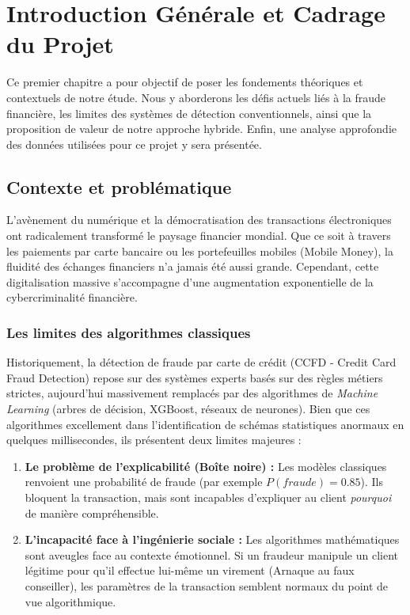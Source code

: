 \documentclass[12pt, a4paper, twoside]{report}
\begin{document}

\tableofcontents
\newpage
\listoffigures
\newpage
\listoftables
\newpage


\chapter{Introduction Générale et Cadrage du Projet}

Ce premier chapitre a pour objectif de poser les fondements théoriques et contextuels de notre étude. Nous y aborderons les défis actuels liés à la fraude financière, les limites des systèmes de détection conventionnels, ainsi que la proposition de valeur de notre approche hybride. Enfin, une analyse approfondie des données utilisées pour ce projet y sera présentée.

\section{Contexte et problématique}

L'avènement du numérique et la démocratisation des transactions électroniques ont radicalement transformé le paysage financier mondial. Que ce soit à travers les paiements par carte bancaire ou les portefeuilles mobiles (Mobile Money), la fluidité des échanges financiers n'a jamais été aussi grande. Cependant, cette digitalisation massive s'accompagne d'une augmentation exponentielle de la cybercriminalité financière.

\subsection{Les limites des algorithmes classiques}
Historiquement, la détection de fraude par carte de crédit (CCFD - Credit Card Fraud Detection) repose sur des systèmes experts basés sur des règles métiers strictes, aujourd'hui massivement remplacés par des algorithmes de \textit{Machine Learning} (arbres de décision, XGBoost, réseaux de neurones). Bien que ces algorithmes excellement dans l'identification de schémas statistiques anormaux en quelques millisecondes, ils présentent deux limites majeures :

\begin{enumerate}
    \item \textbf{Le problème de l'explicabilité (Boîte noire) :} Les modèles classiques renvoient une probabilité de fraude (par exemple $P(fraude) = 0.85$). Ils bloquent la transaction, mais sont incapables d'expliquer au client \textit{pourquoi} de manière compréhensible.
    \item \textbf{L'incapacité face à l'ingénierie sociale :} Les algorithmes mathématiques sont aveugles face au contexte émotionnel. Si un fraudeur manipule un client légitime pour qu'il effectue lui-même un virement (Arnaque au faux conseiller), les paramètres de la transaction semblent normaux du point de vue algorithmique.
\end{enumerate}
\end{document}
